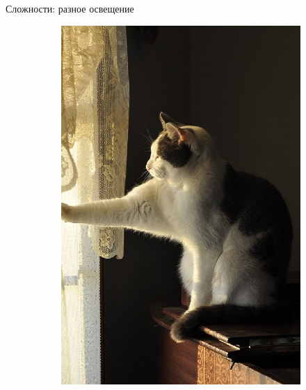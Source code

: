 \documentclass[aspectratio=169]{beamer}
\begin{document}
\begin{frame}{Сложности: разное освещение}
\begin{figure}
\begin{subfigure}[b]{.3\linewidth}
            \includegraphics[width=\linewidth]{graphs/fig9_2.jpg}
        \end{subfigure}
    \end{figure}
\end{frame}
\end{document}
